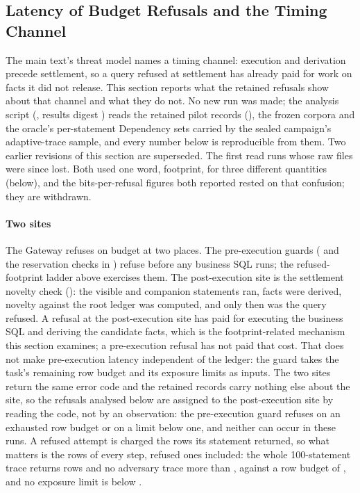 \documentclass[journal,onecolumn]{IEEEtran}
\newcommand{\code}[1]{\texttt{\detokenize{#1}}}
\begin{document}
\subsection{Latency of Budget Refusals and the Timing Channel}
\label{sec:timing-supp}

The main text's threat model names a timing channel: execution and
derivation precede settlement, so a query refused at settlement has already
paid for work on facts it did not release. This section reports what the
retained refusals show about that channel and what they do not. No new run
was made; the analysis script
(, results digest
\TimingResultsDigest{}) reads the retained pilot records
(\TimingCampaigns{}), the frozen corpora and the oracle's per-statement
Dependency sets carried by the sealed campaign's adaptive-trace sample, and
every number below is reproducible from them. Two earlier revisions of this
section are superseded. The first read runs whose raw files were since lost.
Both used one word, footprint, for three different quantities (below), and
the bits-per-refusal figures both reported rested on that confusion; they
are withdrawn.

\paragraph{Two sites}
The Gateway refuses on budget at two places. The pre-execution guards
(\code{DeriveLimits} and the reservation checks in
) refuse before any business SQL runs;
the refused-footprint ladder above exercises them. The post-execution site is
the settlement novelty check (\code{ordinal_exposure_v5.go}): the visible and
companion statements ran, facts were derived, novelty against the root
ledger was computed, and only then was the query refused. A refusal at the
post-execution site has paid for executing the business SQL and deriving the
candidate facts, which is the footprint-related mechanism this section
examines; a pre-execution refusal has not paid that cost. That does not make
pre-execution latency independent of the ledger: the guard takes the task's
remaining row budget and its exposure limits as inputs. The two sites return
the same error code and the retained records carry nothing else about the
site, so the refusals analysed below are assigned to the post-execution site
by reading the code, not by an observation: the pre-execution guard refuses
on an exhausted row budget or on a limit below one, and neither can occur in
these runs. A refused attempt is charged the rows its statement returned, so
what matters is the rows of every step, refused ones included: the whole
100-statement trace returns \TimingTraceTotalRows{} rows and no adversary
trace more than \TimingAdversaryMaxRows{}, against a row budget of
\TimingRowBudget{}, and no exposure limit is below \TimingMinExposureLimit{}.
\end{document}

